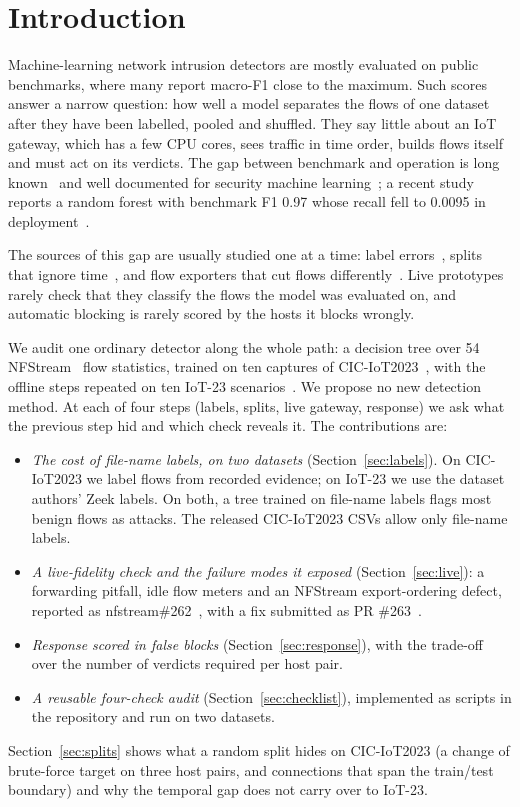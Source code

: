 \section{Introduction}\label{sec:intro}

Machine-learning network intrusion detectors are mostly evaluated on public benchmarks, where many report macro-F1 close to the maximum. Such scores answer a narrow question: how well a model separates the flows of one dataset after they have been labelled, pooled and shuffled. They say little about an IoT gateway, which has a few CPU cores, sees traffic in time order, builds flows itself and must act on its verdicts. The gap between benchmark and operation is long known~\cite{sommer2010outside} and well documented for security machine learning~\cite{arp2022dos,apruzzese2023sok}; a recent study reports a random forest with benchmark F1 0.97 whose recall fell to 0.0095 in deployment~\cite{tang2026hybrid}.

The sources of this gap are usually studied one at a time: label errors~\cite{engelen2021troubleshooting,liu2022error,flood2024smells}, splits that ignore time~\cite{pendlebury2019tesseract,arp2022dos}, and flow exporters that cut flows differently~\cite{pinto2025flowexporter,vitorino2025revisiting}. Live prototypes rarely check that they classify the flows the model was evaluated on, and automatic blocking is rarely scored by the hosts it blocks wrongly.

We audit one ordinary detector along the whole path: a decision tree over 54 NFStream~\cite{aouini2022nfstream} flow statistics, trained on ten captures of CIC-IoT2023~\cite{neto2023ciciot2023}, with the offline steps repeated on ten IoT-23 scenarios~\cite{garcia2020iot23}. We propose no new detection method. At each of four steps (labels, splits, live gateway, response) we ask what the previous step hid and which check reveals it. The contributions are:
\begin{itemize}
\item \emph{The cost of file-name labels, on two datasets} (Section~\ref{sec:labels}). On CIC-IoT2023 we label flows from recorded evidence; on IoT-23 we use the dataset authors' Zeek labels. On both, a tree trained on file-name labels flags most benign flows as attacks. The released CIC-IoT2023 CSVs allow only file-name labels.
\item \emph{A live-fidelity check and the failure modes it exposed} (Section~\ref{sec:live}): a forwarding pitfall, idle flow meters and an NFStream export-ordering defect, reported as nfstream\#262~\cite{nfstream262}, with a fix submitted as PR \#263~\cite{nfstream263}.
\item \emph{Response scored in false blocks} (Section~\ref{sec:response}), with the trade-off over the number of verdicts required per host pair.
\item \emph{A reusable four-check audit} (Section~\ref{sec:checklist}), implemented as scripts in the repository and run on two datasets.
\end{itemize}
Section~\ref{sec:splits} shows what a random split hides on CIC-IoT2023 (a change of brute-force target on three host pairs, and connections that span the train/test boundary) and why the temporal gap does not carry over to IoT-23.
